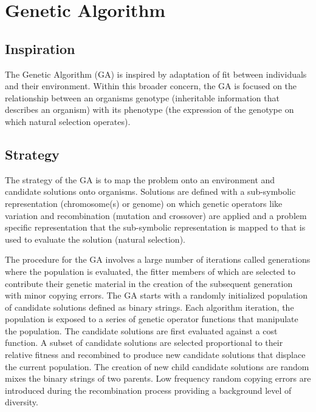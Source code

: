 \section{Genetic Algorithm}

\subsection{Inspiration}
The Genetic Algorithm (GA) is inspired by adaptation of fit between individuals and their environment. Within this broader concern, the GA is focused on the relationship between an organisms genotype (inheritable information that describes an organism) with its phenotype (the expression of the genotype on which natural selection operates).

\subsection{Strategy}
The strategy of the GA is to map the problem onto an environment and candidate solutions onto organisms. Solutions are defined with a sub-symbolic representation (chromosome(s) or genome) on which genetic operators like variation and recombination (mutation and crossover) are applied and a problem specific representation that the sub-symbolic representation is mapped to that is used to evaluate the solution (natural selection). 

The procedure for the GA involves a large number of iterations called generations where the population is evaluated, the fitter members of which are selected to contribute their genetic material in the creation of the subsequent generation with minor copying errors. The GA starts with a randomly initialized population of candidate solutions defined as binary strings. Each algorithm iteration, the population is exposed to a series of genetic operator functions that manipulate the population. The candidate solutions are first evaluated against a cost function. A subset of candidate solutions are selected proportional to their relative fitness and recombined to produce new candidate solutions that displace the current population. The creation of new child candidate solutions are random mixes the binary strings of two parents. Low frequency random copying errors are introduced during the recombination process providing a background level of diversity.

